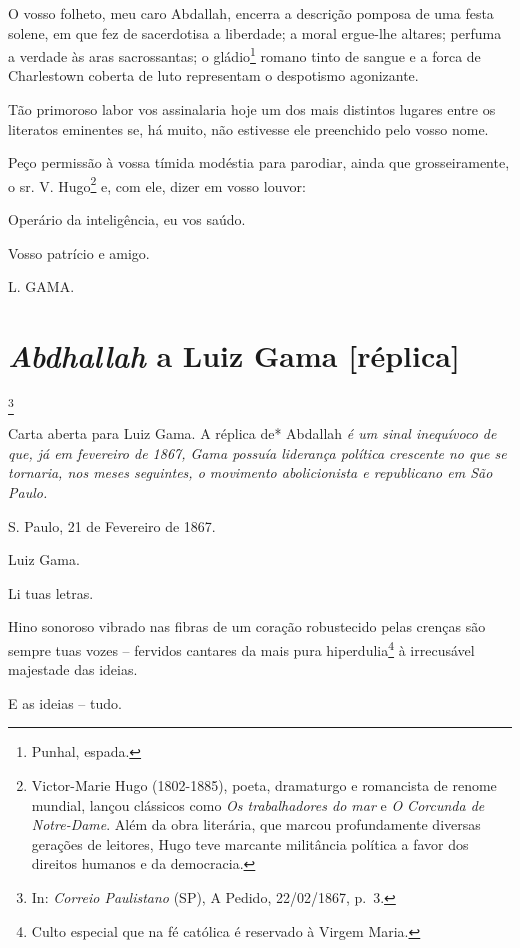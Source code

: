 O vosso folheto, meu caro Abdallah, encerra a descrição pomposa de uma
festa solene, em que fez de sacerdotisa a liberdade; a moral ergue-lhe
altares; perfuma a verdade às aras sacrossantas; o gládio\footnote{
  Punhal, espada.} romano tinto de sangue e a forca de Charlestown
coberta de luto representam o despotismo agonizante.

Tão primoroso labor vos assinalaria hoje um dos mais distintos lugares
entre os literatos eminentes se, há muito, não estivesse ele preenchido
pelo vosso nome.

Peço permissão à vossa tímida modéstia para parodiar, ainda que
grosseiramente, o sr. V. Hugo\footnote{Victor-Marie Hugo (1802-1885),
  poeta, dramaturgo e romancista de renome mundial, lançou clássicos
  como \emph{Os trabalhadores do mar} e \emph{O Corcunda de Notre-Dame}.
  Além da obra literária, que marcou profundamente diversas gerações de
  leitores, Hugo teve marcante militância política a favor dos direitos
  humanos e da democracia.} e, com ele, dizer em vosso louvor:

Operário da inteligência, eu vos saúdo.

Vosso patrício e amigo.

L. GAMA.

\chapter{\emph{Abdhallah} a Luiz Gama {[}réplica{]}}\footnote{In:
  \emph{Correio Paulistano} (SP), A Pedido, 22/02/1867, p.~3.}

\begin{didascalia}
Carta aberta para Luiz Gama. A réplica de* Abdallah \emph{é um sinal
inequívoco de que, já em fevereiro de 1867, Gama possuía liderança
política crescente no que se tornaria, nos meses seguintes, o movimento
abolicionista e republicano em São Paulo.}
\end{didascalia}

\asterisc{}

S. Paulo, 21 de Fevereiro de 1867.

Luiz Gama.

Li tuas letras.

Hino sonoroso vibrado nas fibras de um coração robustecido pelas crenças
são sempre tuas vozes -- fervidos cantares da mais pura
hiperdulia\footnote{Culto especial que na fé católica é reservado à
  Virgem Maria.} à irrecusável majestade das ideias.

E as ideias -- tudo.

